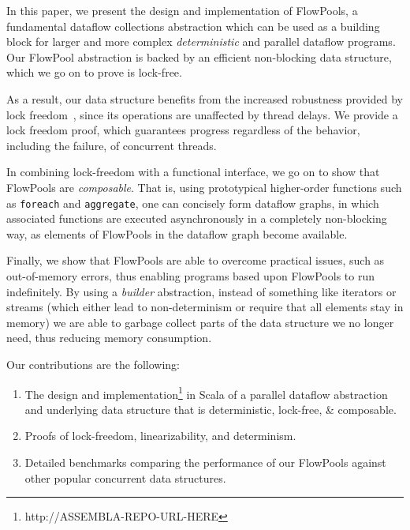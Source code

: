 \documentclass[runningheads,a4paper]{llncs}
\begin{document}
In this paper, we present the design and implementation of FlowPools, a
fundamental dataflow collections abstraction which can be used as a building
block for larger and more complex \textit{deterministic} and parallel
dataflow programs. Our FlowPool abstraction is backed by an efficient
non-blocking data structure, which we go on to prove is lock-free.

As a result, our data structure benefits from the increased robustness
provided by lock freedom~\cite{Herlihy90}, since its operations are unaffected
by thread delays. We provide a lock freedom proof, which guarantees progress
regardless of the behavior, including the failure, of concurrent threads.

In combining lock-freedom with a functional interface, we go on to show that
FlowPools are \textit{composable}. That is, using prototypical higher-order
functions such as \verb=foreach= and \verb=aggregate=, one can concisely form
dataflow graphs, in which associated functions are executed asynchronously in
a completely non-blocking way, as elements of FlowPools in the dataflow graph
become available.

Finally, we show that FlowPools are able to overcome practical issues, such as
out-of-memory errors, thus enabling programs based upon FlowPools to run
indefinitely. By using a \textit{builder} abstraction, instead of something
like iterators or streams (which either lead to non-determinism or require
that all elements stay in memory) we are able to garbage collect parts of the
data structure we no longer need, thus reducing memory consumption.

Our contributions are the following:
\begin{enumerate}
\item The design and implementation\footnote{http://ASSEMBLA-REPO-URL-HERE} 
in Scala of a parallel dataflow abstraction and underlying data structure that 
is deterministic, lock-free, \& composable.
\item Proofs of lock-freedom, linearizability, and determinism.
\item Detailed benchmarks comparing the performance of our FlowPools against
other popular concurrent data structures.
\end{enumerate}

\end{document}
